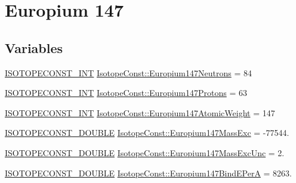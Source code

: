 \hypertarget{group___isotope_const-_europium-_eu147}{}\section{Europium 147}
\label{group___isotope_const-_europium-_eu147}
\subsection*{Variables}
\begin{DoxyCompactItemize}
\item 
\mbox{\hyperlink{group___isotope_const-_macros_ga5f18360b3e99483a35c32d789e62621c}{I\+S\+O\+T\+O\+P\+E\+C\+O\+N\+S\+T\+\_\+\+I\+NT}} \mbox{\hyperlink{group___isotope_const-_europium-_eu147_gaa9577646749a90b6e47fda50b1102d44}{Isotope\+Const\+::\+Europium147\+Neutrons}} = 84
\item 
\mbox{\hyperlink{group___isotope_const-_macros_ga5f18360b3e99483a35c32d789e62621c}{I\+S\+O\+T\+O\+P\+E\+C\+O\+N\+S\+T\+\_\+\+I\+NT}} \mbox{\hyperlink{group___isotope_const-_europium-_eu147_ga7088c370cba8c5a15ebb73a70189bb87}{Isotope\+Const\+::\+Europium147\+Protons}} = 63
\item 
\mbox{\hyperlink{group___isotope_const-_macros_ga5f18360b3e99483a35c32d789e62621c}{I\+S\+O\+T\+O\+P\+E\+C\+O\+N\+S\+T\+\_\+\+I\+NT}} \mbox{\hyperlink{group___isotope_const-_europium-_eu147_ga18f596568d0e28a3f03862ced05f070b}{Isotope\+Const\+::\+Europium147\+Atomic\+Weight}} = 147
\item 
\mbox{\hyperlink{group___isotope_const-_macros_ga8f45a7272ce02c0b4c65c44636ed719a}{I\+S\+O\+T\+O\+P\+E\+C\+O\+N\+S\+T\+\_\+\+D\+O\+U\+B\+LE}} \mbox{\hyperlink{group___isotope_const-_europium-_eu147_ga2b21fbf4d424f1577ba0cf3d75c1f317}{Isotope\+Const\+::\+Europium147\+Mass\+Exc}} = -\/77544.
\item 
\mbox{\hyperlink{group___isotope_const-_macros_ga8f45a7272ce02c0b4c65c44636ed719a}{I\+S\+O\+T\+O\+P\+E\+C\+O\+N\+S\+T\+\_\+\+D\+O\+U\+B\+LE}} \mbox{\hyperlink{group___isotope_const-_europium-_eu147_gac4b32387993d3f8b92558843379fac7d}{Isotope\+Const\+::\+Europium147\+Mass\+Exc\+Unc}} = 2.
\item 
\mbox{\hyperlink{group___isotope_const-_macros_ga8f45a7272ce02c0b4c65c44636ed719a}{I\+S\+O\+T\+O\+P\+E\+C\+O\+N\+S\+T\+\_\+\+D\+O\+U\+B\+LE}} \mbox{\hyperlink{group___isotope_const-_europium-_eu147_gad8c4f0b98640439b645f2a1c2dd381a6}{Isotope\+Const\+::\+Europium147\+Bind\+E\+PerA}} = 8263.
\item 

\end{DoxyCompactItemize}
